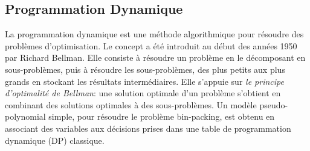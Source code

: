 \documentclass[class=report, crop=false]{standalone}
\begin{document}
    \subsection{Programmation Dynamique}
    La programmation dynamique est une méthode algorithmique pour résoudre des problèmes d'optimisation. Le concept a été introduit au début des années 1950 par Richard Bellman. Elle consiste à résoudre un problème en le décomposant en sous-problèmes, puis à résoudre les sous-problèmes, des plus petits aux plus grands en stockant les résultats intermédiaires.
    Elle s'appuie sur \emph{le principe d'optimalité de Bellman}: une solution optimale d'un problème s'obtient en combinant des solutions optimales à des sous-problèmes. 
    Un modèle pseudo-polynomial simple, pour résoudre le problème bin-packing, est obtenu en associant des variables aux décisions prises dans une table de programmation dynamique (DP) classique.
\end{document}
